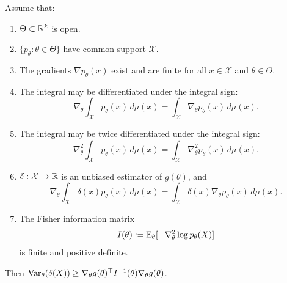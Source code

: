 \begin{theorem}
	Assume that: \begin{enumerate}[label=(\alph*)]
		\item $\Theta \subset \mathbb{R}^k$ is open.
		\item $\{p_\theta : \theta \in \Theta \}$ have common support $\mathcal X$.
		\item The gradients $\nabla p_\theta(x)$ exist and are finite for all $x \in \mathcal X$ and $\theta \in \Theta$.
		\item The integral may be differentiated under the integral sign:
		\[
		\nabla_\theta\int_{\mathcal X}p_\theta(x)\,d\mu(x)
		=
		\int_{\mathcal X}\nabla_\theta p_\theta(x)\,d\mu(x).
		\]
		\item The integral may be twice differentiated under the integral sign:
		\[
		\nabla_\theta^2\int_{\mathcal X}p_\theta(x)\,d\mu(x)
		=
		\int_{\mathcal X}\nabla_\theta^2p_\theta(x)\,d\mu(x).
		\]
		\item $\delta : \mathcal X \to \mathbb{R}$ is an unbiased estimator of $g(\theta)$, and
		\[
		\nabla_\theta\int_{\mathcal X}\delta(x)p_\theta(x)\,d\mu(x)
		=
		\int_{\mathcal X}\delta(x)\nabla_\theta p_\theta(x)\,d\mu(x).
		\]
		\item The Fisher information matrix
		\[
		I(\theta):=\mathbb{E}_\theta[-\nabla_\theta^2\log p_\theta(X)]
		\]
		is finite and positive definite.
	\end{enumerate}
	Then $\operatorname{Var}_\theta(\delta(X)) \geq \nabla_\theta g(\theta)^\top {I^{-1}(\theta)} \nabla_\theta g(\theta)$.
\end{theorem}

